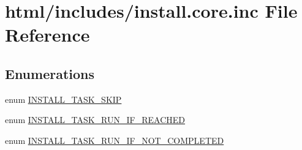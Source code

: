 \hypertarget{install_8core_8inc}{
\section{html/includes/install.core.inc File Reference}
\label{install_8core_8inc}
}
\subsection*{Enumerations}
\begin{DoxyCompactItemize}
\item 
enum \hyperlink{install_8core_8inc_a52d485a9e7b74dd6b159ee8569f44c1a}{INSTALL\_\-TASK\_\-SKIP} 
\item 
enum \hyperlink{install_8core_8inc_a5a0aee9d902a6b08a0b74a873d60c125}{INSTALL\_\-TASK\_\-RUN\_\-IF\_\-REACHED} 
\item 
enum \hyperlink{install_8core_8inc_a66ef8f31ae036a8f204f18b60b88954e}{INSTALL\_\-TASK\_\-RUN\_\-IF\_\-NOT\_\-COMPLETED} 
\end{DoxyCompactItemize}
